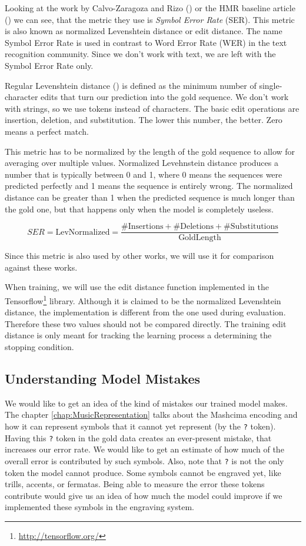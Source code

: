 Looking at the work by Calvo-Zaragoza and Rizo (\cite{Primus}) or the HMR baseline article (\cite{HmrBaseline}) we can see, that the metric they use is \emph{Symbol Error Rate} (SER). This metric is also known as normalized Levenshtein distance or edit distance. The name Symbol Error Rate is used in contrast to Word Error Rate (WER) in the text recognition community. Since we don't work with text, we are left with the Symbol Error Rate only.

Regular Levenshtein distance (\cite{Levenshtein}) is defined as the minimum number of single-character edits that turn our prediction into the gold sequence. We don't work with strings, so we use tokens instead of characters. The basic edit operations are insertion, deletion, and substitution. The lower this number, the better. Zero means a perfect match.

This metric has to be normalized by the length of the gold sequence to allow for averaging over multiple values. Normalized Levehnstein distance produces a number that is typically between 0 and 1, where 0 means the sequences were predicted perfectly and 1 means the sequence is entirely wrong. The normalized distance can be greater than 1 when the predicted sequence is much longer than the gold one, but that happens only when the model is completely useless.

$$
SER = \text{LevNormalized} = \frac{\#\text{Insertions} + \#\text{Deletions} + \#\text{Substitutions}}{\text{GoldLength}}
$$

Since this metric is also used by other works, we will use it for comparison against these works.

When training, we will use the edit distance function implemented in the Tensorflow\footnote{\href{http://tensorflow.org/}{http://tensorflow.org/}} library. Although it is claimed to be the normalized Levenshtein distance, the implementation is different from the one used during evaluation. Therefore these two values should not be compared directly. The training edit distance is only meant for tracking the learning process a determining the stopping condition.


\subsection{Understanding Model Mistakes}
\label{sec:UnderstandingModelMistakes}

We would like to get an idea of the kind of mistakes our trained model makes. The chapter \ref{chap:MusicRepresentation} talks about the Mashcima encoding and how it can represent symbols that it cannot yet represent (by the \verb`?` token). Having this \verb`?` token in the gold data creates an ever-present mistake, that increases our error rate. We would like to get an estimate of how much of the overall error is contributed by such symbols. Also, note that \verb`?` is not the only token the model cannot produce. Some symbols cannot be engraved yet, like trills, accents, or fermatas. Being able to measure the error these tokens contribute would give us an idea of how much the model could improve if we implemented these symbols in the engraving system.

